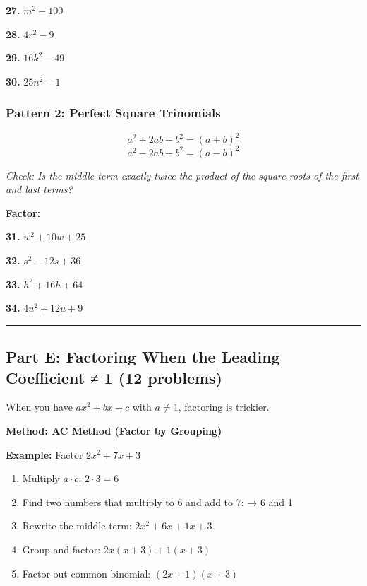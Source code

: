 \documentclass[
  11pt,
]{article}
\providecommand{\tightlist}{%
  \setlength{\itemsep}{0pt}\setlength{\parskip}{0pt}}
\begin{document}
\textbf{27.} \(m^2 - 100\)

\textbf{28.} \(4r^2 - 9\)

\textbf{29.} \(16k^2 - 49\)

\textbf{30.} \(25n^2 - 1\)

\hypertarget{pattern-2-perfect-square-trinomials}{%
\subsubsection{Pattern 2: Perfect Square
Trinomials}\label{pattern-2-perfect-square-trinomials}}

\[a^2 + 2ab + b^2 = (a + b)^2\] \[a^2 - 2ab + b^2 = (a - b)^2\]

\emph{Check: Is the middle term exactly twice the product of the square
roots of the first and last terms?}

\textbf{Factor:}

\textbf{31.} \(w^2 + 10w + 25\)

\textbf{32.} \(s^2 - 12s + 36\)

\textbf{33.} \(h^2 + 16h + 64\)

\textbf{34.} \(4u^2 + 12u + 9\)

\begin{center}\rule{0.5\linewidth}{0.5pt}\end{center}

\hypertarget{part-e-factoring-when-the-leading-coefficient-1-12-problems}{%
\subsection{Part E: Factoring When the Leading Coefficient ≠ 1 (12
problems)}\label{part-e-factoring-when-the-leading-coefficient-1-12-problems}}

When you have \(ax^2 + bx + c\) with \(a \neq 1\), factoring is
trickier.

\textbf{Method: AC Method (Factor by Grouping)}

\textbf{Example:} Factor \(2x^2 + 7x + 3\)

\begin{enumerate}
\def\labelenumi{\arabic{enumi}.}
\tightlist
\item
  Multiply \(a \cdot c\): \(2 \cdot 3 = 6\)
\item
  Find two numbers that multiply to 6 and add to 7: → 6 and 1
\item
  Rewrite the middle term: \(2x^2 + 6x + 1x + 3\)
\item
  Group and factor: \(2x(x + 3) + 1(x + 3)\)
\item
  Factor out common binomial: \((2x + 1)(x + 3)\)
\end{enumerate}
\end{document}
